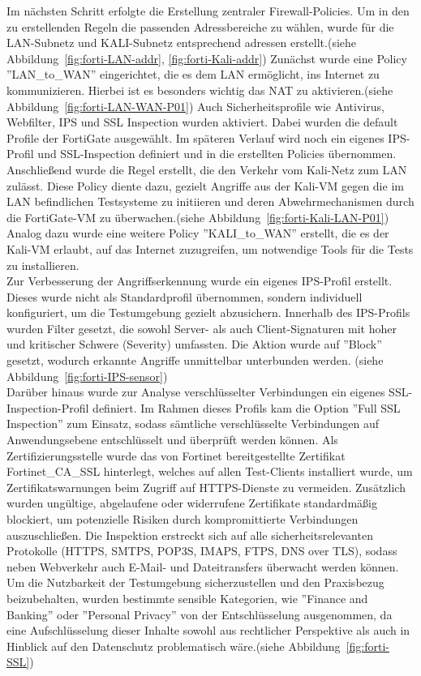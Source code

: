 Im nächsten Schritt erfolgte die Erstellung zentraler Firewall-Policies. Um in den zu erstellenden Regeln die passenden Adressbereiche zu wählen, wurde für die LAN-Subnetz und KALI-Subnetz entsprechend adressen erstellt.(siehe Abbildung~\ref{fig:forti-LAN-addr}, \ref{fig:forti-Kali-addr}) Zunächst wurde eine Policy ''LAN\_to\_WAN'' eingerichtet, die es dem LAN ermöglicht, ins Internet zu kommunizieren. Hierbei ist es besonders wichtig das NAT zu aktivieren.(siehe Abbildung~\ref{fig:forti-LAN-WAN-P01}) Auch Sicherheitsprofile wie Antivirus, Webfilter, IPS und SSL Inspection wurden aktiviert. Dabei wurden die default Profile der FortiGate ausgewählt. Im späteren Verlauf wird noch ein eigenes IPS-Profil und SSL-Inspection definiert und in die erstellten Policies übernommen.\\
Anschließend wurde die Regel erstellt, die den Verkehr vom Kali-Netz zum LAN zulässt. Diese Policy diente dazu, gezielt Angriffe aus der Kali-VM gegen die im LAN befindlichen Testsysteme zu initiieren und deren Abwehrmechanismen durch die FortiGate-VM zu überwachen.(siehe Abbildung~\ref{fig:forti-Kali-LAN-P01}) Analog dazu wurde eine weitere Policy ''KALI\_to\_WAN'' erstellt, die es der Kali-VM erlaubt, auf das Internet zuzugreifen, um notwendige Tools für die Tests zu installieren.\\

Zur Verbesserung der Angriffserkennung wurde ein eigenes IPS-Profil erstellt. Dieses wurde nicht als Standardprofil übernommen, sondern individuell konfiguriert, um die Testumgebung gezielt abzusichern. Innerhalb des IPS-Profils wurden Filter gesetzt, die sowohl Server- als auch Client-Signaturen mit hoher und kritischer Schwere (Severity) umfassten. Die Aktion wurde auf ''Block'' gesetzt, wodurch erkannte Angriffe unmittelbar unterbunden werden. (siehe Abbildung~\ref{fig:forti-IPS-sensor})\\

Darüber hinaus wurde zur Analyse verschlüsselter Verbindungen ein eigenes SSL-Inspection-Profil definiert. Im Rahmen dieses Profils kam die Option ''Full SSL Inspection'' zum Einsatz, sodass sämtliche verschlüsselte Verbindungen auf Anwendungsebene entschlüsselt und überprüft werden können. Als Zertifizierungsstelle wurde das von Fortinet bereitgestellte Zertifikat Fortinet\_CA\_SSL hinterlegt, welches auf allen Test-Clients installiert wurde, um Zertifikatswarnungen beim Zugriff auf HTTPS-Dienste zu vermeiden. Zusätzlich wurden ungültige, abgelaufene oder widerrufene Zertifikate standardmäßig blockiert, um potenzielle Risiken durch kompromittierte Verbindungen auszuschließen. Die Inspektion erstreckt sich auf alle sicherheitsrelevanten Protokolle (HTTPS, SMTPS, POP3S, IMAPS, FTPS, DNS over TLS), sodass neben Webverkehr auch E-Mail- und Dateitransfers überwacht werden können. Um die Nutzbarkeit der Testumgebung sicherzustellen und den Praxisbezug beizubehalten, wurden bestimmte sensible Kategorien, wie ''Finance and Banking'' oder ''Personal Privacy'' von der Entschlüsselung ausgenommen, da eine Aufschlüsselung dieser Inhalte sowohl aus rechtlicher Perspektive als auch in Hinblick auf den Datenschutz problematisch wäre.(siehe Abbildung~\ref{fig:forti-SSL})\\

